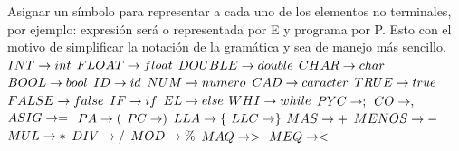 \documentclass[a4paper,10pt]{article}
\begin{document}
\section{}
Asignar un símbolo para representar a cada uno de los elementos no
terminales, por ejemplo: expresión será o representada por E y programa por P.
Esto con el motivo de simplificar la notación de la gramática y sea de manejo
más sencillo.
\\
\noindent
    $INT \rightarrow int\\        $
    $FLOAT \rightarrow float\\    $
    $DOUBLE \rightarrow double\\  $
    $CHAR \rightarrow char\\      $
    $BOOL \rightarrow bool\\      $
    $ID \rightarrow id\\          $
    $NUM \rightarrow numero\\     $
    $CAD \rightarrow caracter\\   $
    $TRUE \rightarrow true\\      $
    $FALSE \rightarrow false\\    $
    $IF \rightarrow if\\          $
    $EL \rightarrow else\\        $
    $WHI \rightarrow while\\      $
    $PYC \rightarrow ;\\          $
    $CO \rightarrow ,\\           $
    $ASIG \rightarrow =\\         $
    $PA \rightarrow (\\           $
    $PC \rightarrow )\\           $
    $LLA \rightarrow \{\\         $
    $LLC \rightarrow \}\\         $
    $MAS \rightarrow +\\          $
    $MENOS \rightarrow - \\       $
    $MUL \rightarrow *\\          $
    $DIV \rightarrow /\\          $
    $MOD \rightarrow \%\\         $
    $MAQ \rightarrow >\\          $
    $MEQ \rightarrow <\\          $
\section{}
\end{document}
